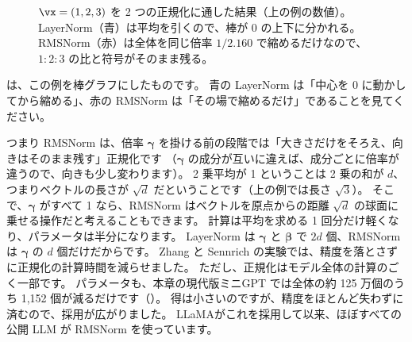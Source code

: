 \begin{figure}[tbp]
\centering
{}
\caption{$\vx=(1,2,3)$ を 2 つの正規化に通した結果（上の例の数値）。LayerNorm（青）は平均を引くので、棒が 0 の上下に分かれる。RMSNorm（赤）は全体を同じ倍率 $1/2.160$ で縮めるだけなので、$1:2:3$ の比と符号がそのまま残る。}
\label{fig:ma-norm}
\end{figure}

は、この例を棒グラフにしたものです。
青の LayerNorm は「中心を 0 に動かしてから縮める」、赤の RMSNorm は「その場で縮めるだけ」であることを見てください。

つまり RMSNorm は、倍率 $\bm\gamma$ を掛ける前の段階では「大きさだけをそろえ、向きはそのまま残す」正規化です
（$\bm\gamma$ の成分が互いに違えば、成分ごとに倍率が違うので、向きも少し変わります）。
2 乗平均が 1 ということは 2 乗の和が $d$、つまりベクトルの長さが $\sqrt d$ だということです（上の例では長さ $\sqrt3$）。
そこで、$\bm\gamma$ がすべて 1 なら、RMSNorm はベクトルを原点からの距離 $\sqrt{d}$ の球面に乗せる操作だと考えることもできます。
計算は平均を求める 1 回分だけ軽くなり、パラメータは半分になります。
LayerNorm は $\bm\gamma$ と $\bm\beta$ で $2d$ 個、RMSNorm は $\bm\gamma$ の $d$ 個だけだからです。
Zhang と Sennrich の実験では、精度を落とさずに正規化の計算時間を減らせました\cite{zhang2019root}。
ただし、正規化はモデル全体の計算のごく一部です。
パラメータも、本章の現代版ミニGPT では全体の約 125 万個のうち 1,152 個が減るだけです（）。
得は小さいのですが、精度をほとんど失わずに済むので、採用が広がりました。
LLaMA\cite{touvron2023llama}がこれを採用して以来、ほぼすべての公開 LLM が RMSNorm を使っています。


